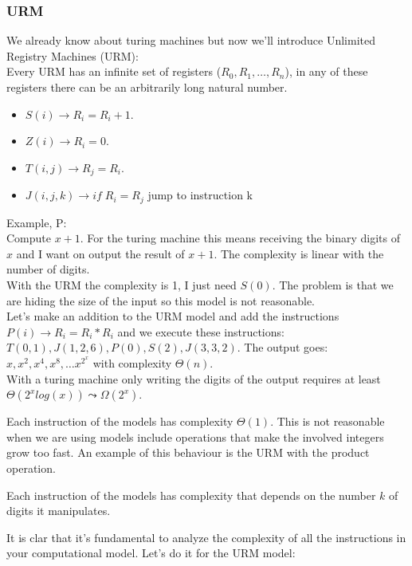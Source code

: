 \subsubsection{URM}
We already know about turing machines but now we'll introduce Unlimited Registry Machines (URM):\\
Every URM has an infinite set of registers ($R_0, R_1, \ldots, R_n$), in any of these registers there can be an arbitrarily long natural number.
\begin{itemize}
    \item $S(i) \rightarrow R_i = R_i+1$.
    \item $Z(i) \rightarrow R_i = 0$.
    \item $T(i,j) \rightarrow R_j = R_i$.
    \item $J(i,j,k) \rightarrow if \;R_i = R_j$ jump to instruction k
\end{itemize}
Example, P:\\
Compute $x+1$. For the turing machine this means receiving the binary digits of $x$ and I want on output the result of $x+1$. The complexity is linear with the number of digits.\\
With the URM the complexity is 1, I just need $S(0)$. The problem is that we are hiding the size of the input so this model is not reasonable.\\
Let's make an addition to the URM model and add the instructions $P(i) \rightarrow R_i = R_i*R_i$ and we execute these instructions:
$T(0,1), J(1,2,6), P(0), S(2), J(3,3,2)$. The output goes: $x, x^2, x^4, x^8, \ldots x^{2^x}$ with complexity $\Theta(n)$. \\With a turing machine only writing the digits of the output requires at least $\Theta(2^xlog(x)) \leadsto \Omega(2^x) $.\\
\begin{definition}
    Each instruction of the models has complexity $\Theta(1)$. This is not reasonable when we are using models include operations that make the involved integers grow too fast. An example of this behaviour is the URM with the product operation.\\
\end{definition}
\begin{definition}
    Each instruction of the models has complexity that depends on the number $k$ of digits it manipulates.\\
\end{definition}
It is clar that it's fundamental to analyze the complexity of all the instructions in your computational model. Let's do it for the URM model:
